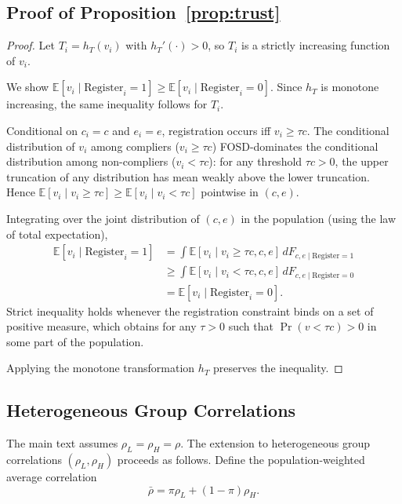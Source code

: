 \subsection{Proof of Proposition~\ref{prop:trust}}
\label{ssec:proof_trust}

\begin{proof}
Let $T_i = h_T(v_i)$ with $h_T'(\cdot) > 0$, so $T_i$ is a strictly increasing function of $v_i$.

We show $\mathbb{E}[v_i \mid \text{Register}_i = 1] \geq \mathbb{E}[v_i \mid \text{Register}_i = 0]$. Since $h_T$ is monotone increasing, the same inequality follows for $T_i$.

Conditional on $c_i = c$ and $e_i = e$, registration occurs iff $v_i \geq \tau c$. The conditional distribution of $v_i$ among compliers ($v_i \geq \tau c$) FOSD-dominates the conditional distribution among non-compliers ($v_i < \tau c$): for any threshold $\tau c > 0$, the upper truncation of any distribution has mean weakly above the lower truncation. Hence $\mathbb{E}[v_i \mid v_i \geq \tau c] \geq \mathbb{E}[v_i \mid v_i < \tau c]$ pointwise in $(c, e)$.

Integrating over the joint distribution of $(c, e)$ in the population (using the law of total expectation),
\begin{align*}
\mathbb{E}[v_i \mid \text{Register}_i = 1] &= \int \mathbb{E}[v_i \mid v_i \geq \tau c, c, e] \, dF_{c,e \mid \text{Register}=1} \\
&\geq \int \mathbb{E}[v_i \mid v_i < \tau c, c, e] \, dF_{c,e \mid \text{Register}=0} \\
&= \mathbb{E}[v_i \mid \text{Register}_i = 0].
\end{align*}
Strict inequality holds whenever the registration constraint binds on a set of positive measure, which obtains for any $\tau > 0$ such that $\Pr(v < \tau c) > 0$ in some part of the population.

Applying the monotone transformation $h_T$ preserves the inequality.
\end{proof}

\subsection{Heterogeneous Group Correlations}
\label{ssec:hetero_rho}

The main text assumes $\rho_L = \rho_H = \rho$. The extension to heterogeneous group correlations $(\rho_L, \rho_H)$ proceeds as follows. Define the population-weighted average correlation
\[
\bar\rho = \pi \rho_L + (1-\pi) \rho_H.
\]

